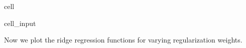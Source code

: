 \documentclass[letterpaper,10pt,english]{jupyterBook}
\begin{document}
\begin{sphinxuseclass}{cell}\begin{sphinxVerbatimInput}

\begin{sphinxuseclass}{cell_input}
\begin{sphinxVerbatim}[commandchars=\\\{\}]
   

  \PYG{p}{[}\PYG{p}{]}
  \PYG{p}{[}\PYG{p}{]}

   
     \PYG{p}{[}\PYG{p}{]}
       
\end{sphinxVerbatim}

\end{sphinxuseclass}\end{sphinxVerbatimInput}

\end{sphinxuseclass}
\sphinxAtStartPar
Now we plot the ridge regression functions for varying regularization weights.
\end{document}
